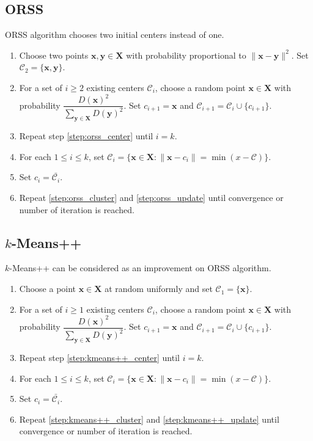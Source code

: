 \documentclass[twoside, 11pt]{article}
\newcommand{\x}{\mathbf{x}}
\newcommand{\X}{\mathbf{X}}
\newcommand{\y}{\mathbf{y}}
\newcommand{\C}{\mathcal{C}}
\begin{document}
	\subsection{ORSS}
	ORSS algorithm \cite{ostrovsky} chooses two initial centers instead of one.
		\begin{enumerate}[i]
			\item Choose two points $\x,\y\in\X$ with probability proportional to $\|\x-\y\|^2$. Set $\C_2=\{\x,\y\}$.
			\item For a set of $i\geq2$ existing centers $\C_i$, choose a random point $\x\in\X$ with probability $\dfrac{D(\x)^2}{\sum_{\y\in\X}D(\y)^2}$. Set $c_{i+1}=\x$ and $\C_{i+1}=\C_i\cup\{c_{i+1}\}$.\label{step:orss_center}
			\item Repeat step \eqref{step:orss_center} until $i=k$.
			\item For each $1\leq i\leq k$, set $\C_i=\{\x\in\X:\|\x-c_i\|=\min(x-\C)\}$.\label{step:orss_cluster}
			\item Set $c_i=\bar{\C_i}$.\label{step:orss_update}
			\item Repeat \eqref{step:orss_cluster} and \eqref{step:orss_update} until convergence or number of iteration is reached.
		\end{enumerate}
	\subsection{$k$-Means++}
	$k$-Means++ \cite{kmeans++} can be considered as an improvement on ORSS algorithm.
		\begin{enumerate}[i]
			\item Choose a point $\x\in\X$ at random uniformly and set $\C_1=\{\x\}$.
			\item For a set of $i\geq1$ existing centers $\C_i$, choose a random point $\x\in\X$ with probability $\dfrac{D(\x)^2}{\sum_{\y\in\X}D(\y)^2}$. Set $c_{i+1}=\x$ and $\C_{i+1}=\C_i\cup\{c_{i+1}\}$.\label{step:kmeans++_center}
			\item Repeat step \eqref{step:kmeans++_center} until $i=k$.
			\item For each $1\leq i\leq k$, set $\C_i=\{\x\in\X:\|\x-c_i\|=\min(x-\C)\}$.\label{step:kmeans++_cluster}
			\item Set $c_i=\bar{\C_i}$.\label{step:kmeans++_update}
			\item Repeat \eqref{step:kmeans++_cluster} and \eqref{step:kmeans++_update} until convergence or number of iteration is reached.\label{step:kmeans++_repeat}
		\end{enumerate}
\end{document}
